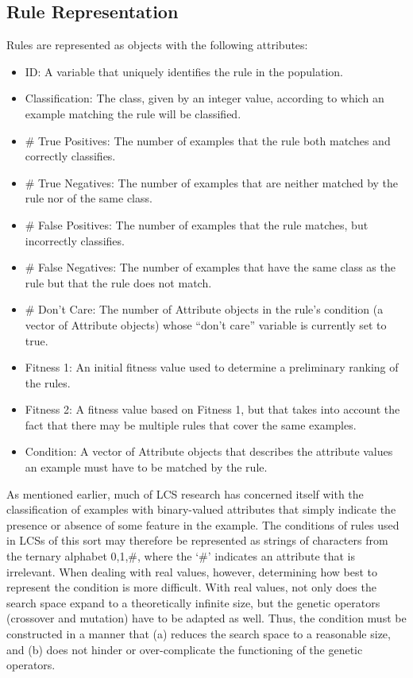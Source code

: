\documentclass[11pt]{article}
\begin{document}
\subsection{Rule Representation}

Rules are represented as objects with the following attributes:

\begin{itemize}
\item ID: A variable that uniquely identifies the rule in the population.
\item Classification: The class, given by an integer value, according to which an example matching the rule will be classified.
\item \# True Positives: The number of examples that the rule both matches and correctly classifies.
\item \# True Negatives: The number of examples that are neither matched by the rule nor of the same class.
\item \# False Positives: The number of examples that the rule matches, but incorrectly classifies.
\item \# False Negatives: The number of examples that have the same class as the rule but that the rule does not match.
\item \# Don't Care: The number of Attribute objects in the rule's condition (a vector of Attribute objects) whose ``don't care'' variable is currently set to true.
\item Fitness 1: An initial fitness value used to determine a preliminary ranking of the rules.
\item Fitness 2: A fitness value based on Fitness 1, but that takes into account the fact that there may be multiple rules that cover the same examples.
\item Condition: A vector of Attribute objects that describes the attribute values an example must have to be matched by the rule.

\end{itemize}

As mentioned earlier, much of LCS research has concerned itself with the classification of examples with binary-valued attributes that simply indicate the presence or absence of some feature in the example. The conditions of rules used in LCSs of this sort may therefore be represented as strings of characters from the ternary alphabet {0,1,\#}, where the `\#' indicates an attribute that is irrelevant. When dealing with real values, however, determining how best to represent the condition is more difficult. With real values, not only does the search space expand to a theoretically infinite size, but the genetic operators (crossover and mutation) have to be adapted as well. Thus, the condition must be constructed in a manner that (a) reduces the search space to a reasonable size, and (b) does not hinder or over-complicate the functioning of the genetic operators.
\end{document}
